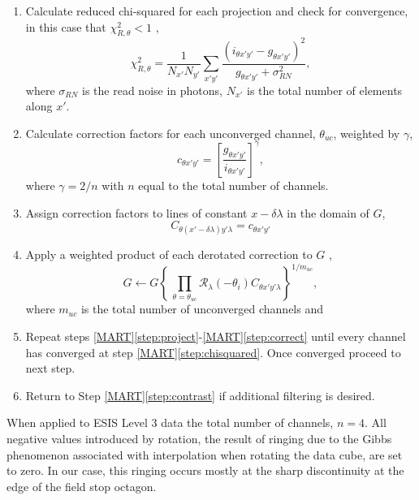 \begin{enumerate}
		\item \label{step:chisquared} Calculate reduced chi-squared for each projection and check for convergence, in this case that $\chi_{R,\theta}^2 < 1$ , 
			\begin{equation}
				\chi_{R,\theta}^2 = \frac{1}{N_{x'} N_{y'}}\sum_{x'y'} \frac{(i_{\theta x'y'}-g_{\theta x'y'})^2}{g_{\theta x'y'}+\sigma^2_{RN}},
			\end{equation}
		where $\sigma_{RN}$ is the read noise in photons, $N_{x'}$ is the total number of elements along $x'$.
		
		\item Calculate correction factors for each unconverged channel, $\theta_{uc}$, weighted by $\gamma$, 
			\begin{equation} \label{eq:correctionfactor}
				c_{\theta x'y'} = \left[\frac{g_{\theta x'y'}}{i_{\theta x'y'}}\right]^\gamma,
			\end{equation}
		where $\gamma = 2/n$ with $n$ equal to the total number of channels.
		
		\item Assign correction factors to lines of constant $x-\delta\lambda$ in the domain of $G$,
			\begin{equation}
				C_{\theta (x'-\delta\lambda)y'\lambda} = c_{\theta x'y'}
			\end{equation}	
		
		\item \label{step:correct} Apply a weighted product of each derotated correction to $G$ ,
			\begin{equation}\label{eq:correct}
				G \leftarrow G\left\lbrace  \,\prod_{\theta=\theta_{uc}}  \mathcal{R}_\lambda(-\theta_i)C_{\theta x'y'\lambda} \right\rbrace^{1/m_{uc}},
			\end{equation}
		where $m_{uc}$ is the total number of unconverged channels and 
		
		\item Repeat steps \ref{MART}\ref{step:project}-\ref{MART}\ref{step:correct}
		until every channel has converged at step \ref{MART}\ref{step:chisquared}. Once converged proceed to next step.
		\item Return to Step \ref{MART}\ref{step:contrast} if additional filtering is desired.
	\end{enumerate}
	When applied to  ESIS Level 3 data the total number of channels, $n = 4$.
	All negative values introduced by rotation, the result of ringing due to the Gibbs phenomenon associated with interpolation when rotating the data cube, are set to zero.
	In our case, this ringing occurs mostly at the sharp discontinuity at the edge of the field stop octagon. 
	
